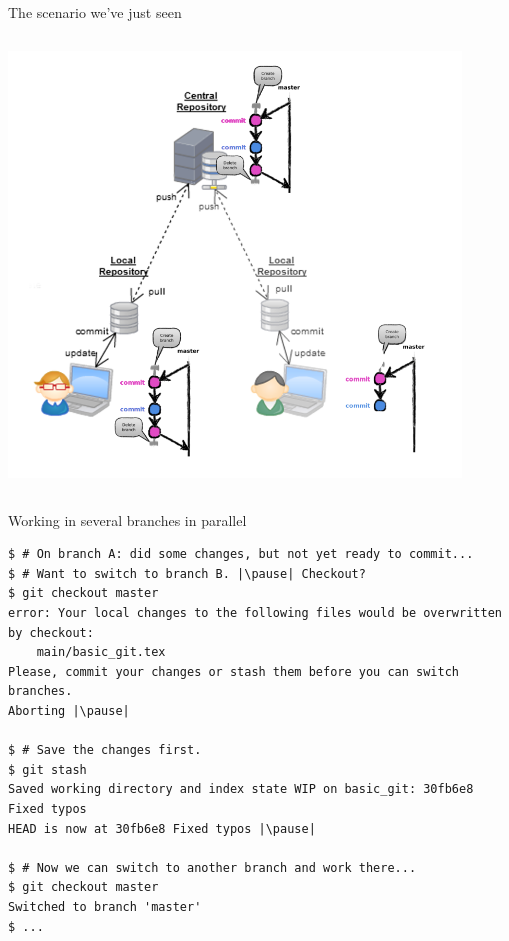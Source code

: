 \begin{frame}[fragile]{The scenario we've just seen}
\begin{columns}
\begin{column}{0.4\textwidth}
\begin{center}
{				\includegraphics[width=0.9\textwidth]{multiuser_remote_delete.png}
			}
	\end{center}
\end{column}
\end{columns}
\end{frame}

\begin{frame}[fragile]{Working in several branches in parallel}
	\begin{tiny}
		\begin{lstlisting}
$ # On branch A: did some changes, but not yet ready to commit...
$ # Want to switch to branch B. |\pause| Checkout?
$ git checkout master
error: Your local changes to the following files would be overwritten by checkout:
	main/basic_git.tex
Please, commit your changes or stash them before you can switch branches.
Aborting |\pause|

$ # Save the changes first.
$ git stash
Saved working directory and index state WIP on basic_git: 30fb6e8 Fixed typos
HEAD is now at 30fb6e8 Fixed typos |\pause|

$ # Now we can switch to another branch and work there...
$ git checkout master
Switched to branch 'master'
$ ...
		\end{lstlisting}
	\end{tiny}
\end{frame}

